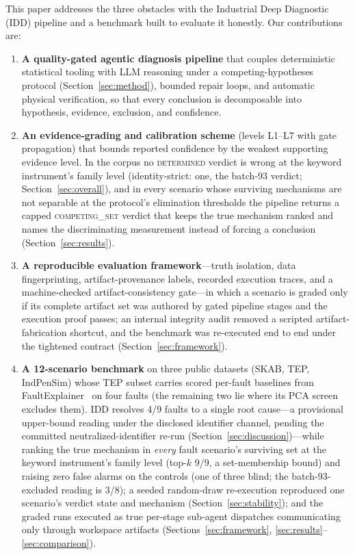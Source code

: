 \documentclass[preprint,10pt]{elsarticle}
\begin{document}
This paper addresses the three obstacles with the Industrial Deep Diagnostic (IDD) pipeline and a benchmark built to evaluate it honestly. Our contributions are:

\begin{enumerate}
\item \textbf{A quality-gated agentic diagnosis pipeline} that couples deterministic statistical tooling with LLM reasoning under a competing-hypotheses protocol (Section~\ref{sec:method}), bounded repair loops, and automatic physical verification, so that every conclusion is decomposable into hypothesis, evidence, exclusion, and confidence.
\item \textbf{An evidence-grading and calibration scheme} (levels L1--L7 with gate propagation) that bounds reported confidence by the weakest supporting evidence level. In the corpus no \mbox{\textsc{determined}} verdict is wrong at the keyword instrument's family level (identity-strict: one, the batch-93 verdict; Section~\ref{sec:overall}), and in every scenario whose surviving mechanisms are not separable at the protocol's elimination thresholds the pipeline returns a capped \mbox{\textsc{competing\_set}} verdict that keeps the true mechanism ranked and names the discriminating measurement instead of forcing a conclusion (Section~\ref{sec:results}).
\item \textbf{A reproducible evaluation framework}---truth isolation, data fingerprinting, artifact-provenance labels, recorded execution traces, and a machine-checked artifact-consistency gate---in which a scenario is graded only if its complete artifact set was authored by gated pipeline stages and the execution proof passes; an internal integrity audit removed a scripted artifact-fabrication shortcut, and the benchmark was re-executed end to end under the tightened contract (Section~\ref{sec:framework}).
\item \textbf{A 12-scenario benchmark} on three public datasets (SKAB, TEP, IndPenSim) whose TEP subset carries scored per-fault baselines from FaultExplainer~\cite{khan2024faultexplainer} on four faults (the remaining two lie where its PCA screen excludes them). IDD resolves 4/9 faults to a single root cause---a provisional upper-bound reading under the disclosed identifier channel, pending the committed neutralized-identifier re-run (Section~\ref{sec:discussion})---while ranking the true mechanism in \emph{every} fault scenario's surviving set at the keyword instrument's family level (top-$k$ 9/9, a set-membership bound) and raising zero false alarms on the controls (one of three blind; the batch-93-excluded reading is 3/8); a seeded random-draw re-execution reproduced one scenario's verdict state and mechanism (Section~\ref{sec:stability}); and the graded runs executed as true per-stage sub-agent dispatches communicating only through workspace artifacts (Sections~\ref{sec:framework}, \ref{sec:results}--\ref{sec:comparison}).
\end{enumerate}
\end{document}
